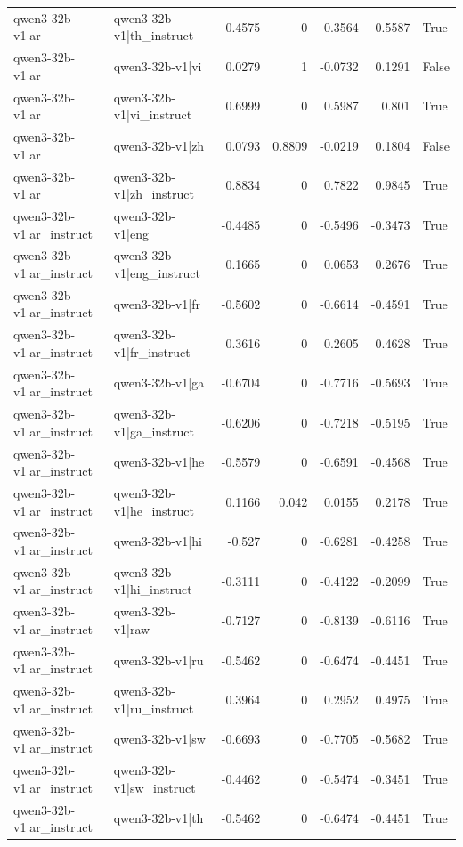 \begin{table}
\begin{tabular}{l l r r r r l}
qwen3-32b-v1|ar & qwen3-32b-v1|th_instruct & 0.4575 & 0 & 0.3564 & 0.5587 & True \\
qwen3-32b-v1|ar & qwen3-32b-v1|vi & 0.0279 & 1 & -0.0732 & 0.1291 & False \\
qwen3-32b-v1|ar & qwen3-32b-v1|vi_instruct & 0.6999 & 0 & 0.5987 & 0.801 & True \\
qwen3-32b-v1|ar & qwen3-32b-v1|zh & 0.0793 & 0.8809 & -0.0219 & 0.1804 & False \\
qwen3-32b-v1|ar & qwen3-32b-v1|zh_instruct & 0.8834 & 0 & 0.7822 & 0.9845 & True \\
qwen3-32b-v1|ar_instruct & qwen3-32b-v1|eng & -0.4485 & 0 & -0.5496 & -0.3473 & True \\
qwen3-32b-v1|ar_instruct & qwen3-32b-v1|eng_instruct & 0.1665 & 0 & 0.0653 & 0.2676 & True \\
qwen3-32b-v1|ar_instruct & qwen3-32b-v1|fr & -0.5602 & 0 & -0.6614 & -0.4591 & True \\
qwen3-32b-v1|ar_instruct & qwen3-32b-v1|fr_instruct & 0.3616 & 0 & 0.2605 & 0.4628 & True \\
qwen3-32b-v1|ar_instruct & qwen3-32b-v1|ga & -0.6704 & 0 & -0.7716 & -0.5693 & True \\
qwen3-32b-v1|ar_instruct & qwen3-32b-v1|ga_instruct & -0.6206 & 0 & -0.7218 & -0.5195 & True \\
qwen3-32b-v1|ar_instruct & qwen3-32b-v1|he & -0.5579 & 0 & -0.6591 & -0.4568 & True \\
qwen3-32b-v1|ar_instruct & qwen3-32b-v1|he_instruct & 0.1166 & 0.042 & 0.0155 & 0.2178 & True \\
qwen3-32b-v1|ar_instruct & qwen3-32b-v1|hi & -0.527 & 0 & -0.6281 & -0.4258 & True \\
qwen3-32b-v1|ar_instruct & qwen3-32b-v1|hi_instruct & -0.3111 & 0 & -0.4122 & -0.2099 & True \\
qwen3-32b-v1|ar_instruct & qwen3-32b-v1|raw & -0.7127 & 0 & -0.8139 & -0.6116 & True \\
qwen3-32b-v1|ar_instruct & qwen3-32b-v1|ru & -0.5462 & 0 & -0.6474 & -0.4451 & True \\
qwen3-32b-v1|ar_instruct & qwen3-32b-v1|ru_instruct & 0.3964 & 0 & 0.2952 & 0.4975 & True \\
qwen3-32b-v1|ar_instruct & qwen3-32b-v1|sw & -0.6693 & 0 & -0.7705 & -0.5682 & True \\
qwen3-32b-v1|ar_instruct & qwen3-32b-v1|sw_instruct & -0.4462 & 0 & -0.5474 & -0.3451 & True \\
qwen3-32b-v1|ar_instruct & qwen3-32b-v1|th & -0.5462 & 0 & -0.6474 & -0.4451 & True \\

\end{tabular}
\end{table}
